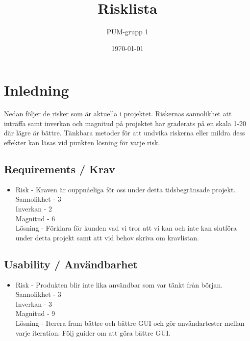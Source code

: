 

\ifpdf
\else
\fi

\title{Risklista}
\author{PUM-grupp 1}
\date{\today}



\maketitle\thispagestyle{empty}

\newpage

\setcounter{tocdepth}{2}
\newpage

\section{Inledning}

Nedan följer de risker som är aktuella i projektet. Riskernas sannolikhet att inträffa samt inverkan och magnitud på projektet har graderats på en skala 1-20 där lägre är bättre. Tänkbara metoder för att undvika riskerna eller mildra dess effekter kan läsas vid punkten lösning för varje risk.



\subsection{Requirements / Krav}
\begin{itemize}
\item Risk - Kraven är ouppnåeliga för oss under detta tidsbegränsade projekt.
\\Sannolikhet - 3
\\Inverkan - 2
\\Magnitud - 6
\\Lösning - Förklara för kunden vad vi tror att vi kan och inte kan slutföra under detta projekt samt att vid behov skriva om kravlistan.
\end{itemize}

\subsection{Usability / Användbarhet}
\begin{itemize}
\item Risk - Produkten blir inte lika användbar som var tänkt från början.
\\Sannolikhet - 3
\\Inverkan - 3
\\Magnitud - 9
\\Lösning - Iterera fram bättre och bättre GUI och gör användartester mellan varje iteration. Följ guider om att göra bättre GUI.
\end{itemize}

